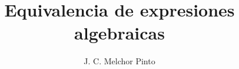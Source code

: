 \documentclass[12pt,addpoints,answers]{guia}
\title{Equivalencia de expresiones algebraicas}
\author{J. C. Melchor Pinto}
\begin{document}
\pagestyle{headandfoot}

\INFO
\begin{questions}
    \questionboxed[18]{}
    \questionboxed[16]{}
    \questionboxed[10]{}
    \questionboxed[16]{}
    \questionboxed[20]{}
    \questionboxed[20]{}
\end{questions}
\end{document}
